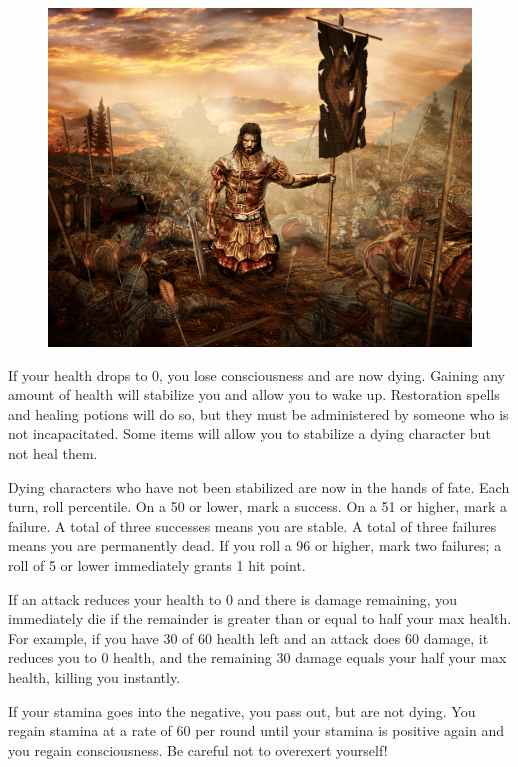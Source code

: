 \documentclass[12pt]{book}
\begin{document}
\begin{figure}
	\includegraphics[width=\textwidth]{victory.png}
\end{figure}

If your health drops to 0, you lose consciousness and are now dying. Gaining any amount of health will stabilize you and allow you to wake up. Restoration spells and healing potions will do so, but they must be administered by someone who is not incapacitated. Some items will allow you to stabilize a dying character but not heal them.

Dying characters who have not been stabilized are now in the hands of fate. Each turn, roll percentile. On a 50 or lower, mark a success. On a 51 or higher, mark a failure. A total of three successes means you are stable. A total of three failures means you are permanently dead. If you roll a 96 or higher, mark two failures; a roll of 5 or lower immediately grants 1 hit point.

If an attack reduces your health to 0 and there is damage remaining, you immediately die if the remainder is greater than or equal to half your max health. For example, if you have 30 of 60 health left and an attack does 60 damage, it reduces you to 0 health, and the remaining 30 damage equals your half your max health, killing you instantly.

If your stamina goes into the negative, you pass out, but are not dying. You regain stamina at a rate of 60 per round until your stamina is positive again and you regain consciousness. Be careful not to overexert yourself!
\end{document}
